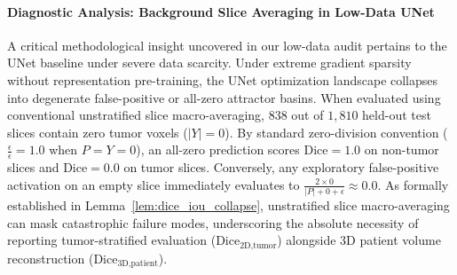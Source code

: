 \documentclass{article}
\begin{document}
\paragraph{Diagnostic Analysis: Background Slice Averaging in Low-Data UNet}
A critical methodological insight uncovered in our low-data audit pertains to the UNet baseline under severe data scarcity. Under extreme gradient sparsity without representation pre-training, the UNet optimization landscape collapses into degenerate false-positive or all-zero attractor basins. When evaluated using conventional unstratified slice macro-averaging, $838$ out of $1,810$ held-out test slices contain zero tumor voxels ($|Y| = 0$). By standard zero-division convention ($\frac{\epsilon}{\epsilon} = 1.0$ when $P = Y = 0$), an all-zero prediction scores $\text{Dice} = 1.0$ on non-tumor slices and $\text{Dice} = 0.0$ on tumor slices. Conversely, any exploratory false-positive activation on an empty slice immediately evaluates to $\frac{2 \times 0}{|P| + 0 + \epsilon} \approx 0.0$. As formally established in Lemma~\ref{lem:dice_iou_collapse}, unstratified slice macro-averaging can mask catastrophic failure modes, underscoring the absolute necessity of reporting tumor-stratified evaluation ($\text{Dice}_{\text{2D,tumor}}$) alongside 3D patient volume reconstruction ($\text{Dice}_{\text{3D,patient}}$).
\end{document}
